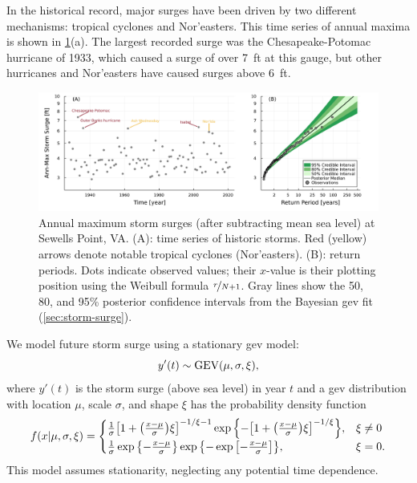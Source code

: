 \documentclass[11pt]{article}
\begin{document}
In the historical record, major surges have been driven by two different mechanisms: tropical cyclones and Nor'easters.
This time series of annual maxima is shown in \cref{fig:surge-obs-return}(a).
The largest recorded surge was the Chesapeake-Potomac hurricane of 1933, which caused a surge of over \SI{7}{ft} at this gauge, but other hurricanes and Nor'easters have caused surges above \SI{6}{ft}.

\begin{figure}
    \centering
    \includegraphics[width=\textwidth]{surge-obs-return}
    \caption{
        Annual maximum storm surges (after subtracting mean sea level) at Sewells Point, VA.
        (A):
        time series of historic storms.
        Red (yellow) arrows denote notable tropical cyclones (Nor'easters).
        (B):
        return periods.
        Dots indicate observed values; their $x$-value is their plotting position using the Weibull formula $\nicefrac{r}{N+1}$.
        Gray lines show the 50, 80, and 95\% posterior confidence intervals from the Bayesian \gls{gev} fit (\cref{sec:storm-surge}).
    }\label{fig:surge-obs-return}
\end{figure}

We model future storm surge using a stationary \gls{gev} model:
\begin{equation}\label{eq:surge-model}
    y'(t) \sim \text{GEV}\qty(\mu, \sigma, \xi),
\end{equation}
where $y'(t)$ is the storm surge (above sea level) in year $t$ and a \gls{gev} distribution with location $\mu$, scale $\sigma$, and shape $\xi$ has the probability density function
\begin{equation*}
    f(x | \mu, \sigma, \xi)= \begin{cases}
        \frac{1}{\sigma} \qty[ 1 + \qty( \frac{x-\mu}{\sigma} ) \xi ]^{-1 / \xi - 1} \exp \qty{- \qty[1+\qty(\frac{x-\mu}{\sigma}) \xi ]^{-1 / \xi} }, & \xi \neq 0 \\
        \frac{1}{\sigma} \exp \qty{-\frac{x-\mu}{\sigma}} \exp \qty{ -\exp \qty[-\frac{x-\mu}{\sigma}]},                                               & \xi=0.
    \end{cases}
\end{equation*}
This model assumes stationarity, neglecting any potential time dependence.
\end{document}
